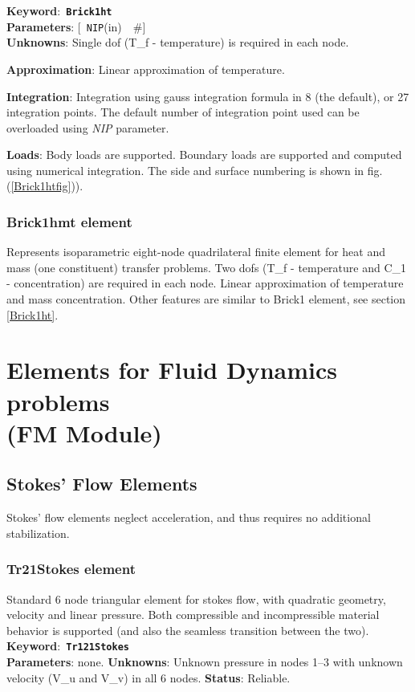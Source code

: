 \documentclass[a4paper]{article}
\newcommand{\descitem}[1]{{\noindent \bf #1}:}
\newcommand{\elemkeyword}[1]{\descitem{Keyword}~{\bf \texttt{#1}}}
\newcommand{\elemparam}[2]{{{\texttt{#1}\tiny (#2)}~~\#}}
\newcommand{\optelemparam}[2]{{[~\elemparam{#1}{#2}]}}
\newcommand{\param}[1]{{\em #1}}
\begin{document}
\elemkeyword{Brick1ht}\\
\descitem{Parameters} \optelemparam{NIP}{in}\\
\descitem{Unknowns}
Single dof (T\_f - temperature) is required in each node.

\descitem{Approximation} Linear approximation of temperature.

\descitem{Integration}
Integration using gauss integration formula
in 8 (the default), or 27 integration points. The default number of
integration point used can be overloaded using \param{NIP} parameter.

\descitem{Loads} Body loads are supported. Boundary loads are
supported and computed using numerical integration. The side and
surface numbering is shown in fig. (\ref{Brick1htfig})).

\subsubsection{Brick1hmt element}
Represents isoparametric eight-node quadrilateral finite element for
heat and mass (one constituent) transfer problems. 
Two dofs (T\_f - temperature and C\_1 - concentration) are required in
each node. Linear approximation of temperature and mass concentration.
Other features are similar to Brick1 element, see section \ref{Brick1ht}.

\section{Elements for Fluid Dynamics problems\\(FM Module)}
\subsection{Stokes' Flow Elements}
Stokes' flow elements neglect acceleration, and thus requires no additional stabilization.

\subsubsection{Tr21Stokes element}
Standard 6 node triangular element for stokes flow, with quadratic geometry, velocity and linear pressure.
Both compressible and incompressible material behavior is supported (and also the seamless transition between the two).
\elemkeyword{Tr121Stokes}\\
\descitem{Parameters} none.
\descitem{Unknowns} Unknown pressure in nodes 1--3 with unknown velocity (V\_u and V\_v) in all 6 nodes.
\descitem{Status} Reliable.
\end{document}
